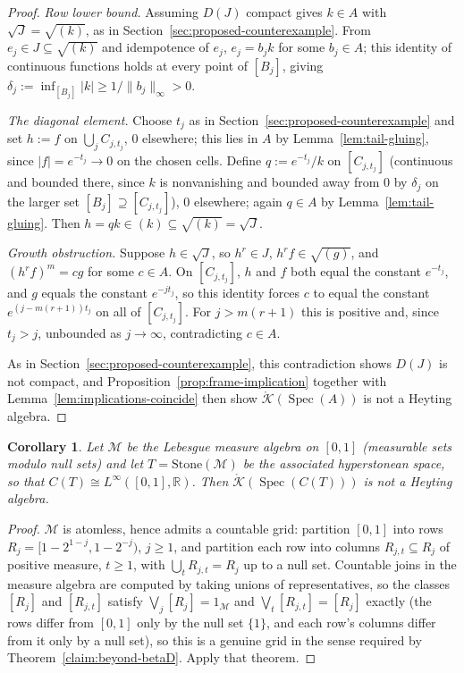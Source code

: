 \documentclass{amsart}
\newtheorem{corollary}[theorem]{Corollary}
\theoremstyle{definition}
\theoremstyle{remark}
\newcommand{\Spec}[1]{\operatorname{Spec}\left(#1\right)}
\newcommand{\reals}{\mathbb R}
\newcommand{\cont}[1]{C\left(#1\right)}
\newcommand{\KOp}[1]{\mathring{\mathcal{K}}\left(#1\right)}
\begin{document}
\begin{proof}
\emph{Row lower bound.} Assuming $D(J)$ compact gives $k\in A$ with
$\sqrt J=\sqrt{(k)}$, as in
Section~\ref{sec:proposed-counterexample}. From $e_j\in J\subseteq
\sqrt{(k)}$ and idempotence of $e_j$, $e_j=b_jk$ for some $b_j\in A$;
this identity of continuous functions holds at every point of $[B_j]$,
giving $\delta_j:=\inf_{[B_j]}|k|\geq1/\|b_j\|_\infty>0$.

\emph{The diagonal element.} Choose $t_j$ as in
Section~\ref{sec:proposed-counterexample} and set $h:=f$ on
$\bigcup_jC_{j,t_j}$, $0$ elsewhere; this lies in $A$ by
Lemma~\ref{lem:tail-gluing}, since $|f|=e^{-t_j}\to0$ on the chosen
cells. Define $q:=e^{-t_j}/k$ on $[C_{j,t_j}]$ (continuous and bounded
there, since $k$ is nonvanishing and bounded away from $0$ by $\delta_j$
on the larger set $[B_j]\supseteq[C_{j,t_j}]$), $0$ elsewhere; again $q\in
A$ by Lemma~\ref{lem:tail-gluing}. Then $h=qk\in(k)\subseteq\sqrt{(k)}=
\sqrt J$.

\emph{Growth obstruction.} Suppose $h\in\sqrt J$, so $h^r\in J$,
$h^rf\in\sqrt{(g)}$, and $(h^rf)^m=cg$ for some $c\in A$. On
$[C_{j,t_j}]$, $h$ and $f$ both equal the constant $e^{-t_j}$, and $g$
equals the constant $e^{-jt_j}$, so this identity forces $c$ to equal the
constant $e^{(j-m(r+1))t_j}$ on all of $[C_{j,t_j}]$. For $j>m(r+1)$ this
is positive and, since $t_j>j$, unbounded as $j\to\infty$, contradicting
$c\in A$.

As in Section~\ref{sec:proposed-counterexample}, this contradiction shows
$D(J)$ is not compact, and Proposition~\ref{prop:frame-implication}
together with Lemma~\ref{lem:implications-coincide} then show
$\KOp{\Spec A}$ is not a Heyting algebra.
\end{proof}

\begin{corollary}\label{cor:hyperstonean}
Let $\mathcal M$ be the Lebesgue measure algebra on $[0,1]$ (measurable
sets modulo null sets) and let $T=\mathrm{Stone}(\mathcal M)$ be the
associated hyperstonean space, so that $\cont{T}\cong
L^\infty([0,1],\reals)$. Then $\KOp{\Spec{\cont{T}}}$ is not a
Heyting algebra.
\end{corollary}

\begin{proof}
$\mathcal M$ is atomless, hence admits a countable grid: partition
$[0,1]$ into rows $R_j=[1-2^{1-j},1-2^{-j})$, $j\geq1$, and partition
each row into columns $R_{j,t}\subseteq R_j$ of positive measure,
$t\geq1$, with $\bigcup_tR_{j,t}=R_j$ up to a null set. Countable joins
in the measure algebra are computed by taking unions of representatives,
so the classes $[R_j]$ and $[R_{j,t}]$ satisfy
$\bigvee_j[R_j]=1_{\mathcal M}$ and $\bigvee_t[R_{j,t}]=[R_j]$ exactly
(the rows differ from $[0,1]$ only by the null set $\{1\}$, and each
row's columns differ from it only by a null set), so this is a genuine
grid in the sense required by Theorem~\ref{claim:beyond-betaD}. Apply
that theorem.
\end{proof}
\end{document}
